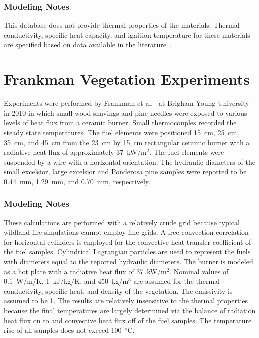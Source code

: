\subsubsection{Modeling Notes}

This database does not provide thermal properties of the materials. Thermal conductivity, specific heat capacity, and ignition temperature for these materials are specified based on data available in the literature~\cite{SFPE:Tewarson}.

\section{Frankman Vegetation Experiments}
\label{Frankman_Vegetation_Description}

Experiments were performed by Frankman et al.~\cite{Frankman:CST2010} at Brigham Young University in 2010 in which small wood shavings and pine needles were exposed to various levels of heat flux from a ceramic burner. Small thermocouples recorded the steady state temperatures. The fuel elements were positioned 15~cm, 25~cm, 35~cm, and 45~cm from the 23~cm by 15~cm rectangular ceramic burner with a radiative heat flux of approximately 37~kW/m$^2$. The fuel elements were suspended by a wire with a horizontal orientation. The hydraulic diameters of the small excelsior, large excelsior and Ponderosa pine samples were reported to be 0.44~mm, 1.29~mm, and 0.70~mm, respectively.

\subsubsection{Modeling Notes}

These calculations are performed with a relatively crude grid because typical wildland fire simulations cannot employ fine grids. A free convection correlation for horizontal cylinders is employed for the convective heat transfer coefficient of the fuel samples. Cylindrical Lagrangian particles are used to represent the fuels with diameters equal to the reported hydraulic diameters. The burner is modeled as a hot plate with a radiative heat flux of 37~kW/m$^2$. Nominal values of 0.1~W/m/K, 1~kJ/kg/K, and 450~kg/m$^3$ are assumed for the thermal conductivity, specific heat, and density of the vegetation. The emissivity is assumed to be 1. The results are relatively insensitive to the thermal properties because the final temperatures are largely determined via the balance of radiation heat flux on to and convective heat flux off of the fuel samples. The temperature rise of all samples does not exceed 100~$^\circ$C.


